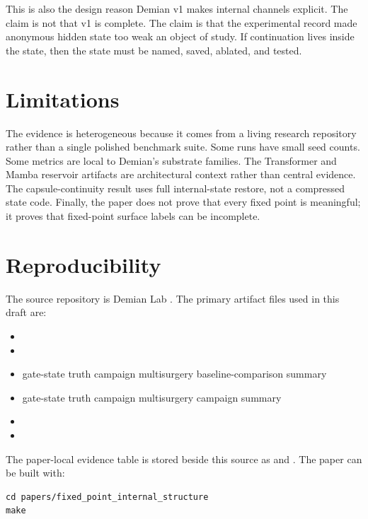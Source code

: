 \documentclass[11pt]{article}
\begin{document}
This is also the design reason Demian v1 makes internal channels explicit. The
claim is not that v1 is complete. The claim is that the experimental record
made anonymous hidden state too weak an object of study. If continuation lives
inside the state, then the state must be named, saved, ablated, and tested.

\section{Limitations}

The evidence is heterogeneous because it comes from a living research
repository rather than a single polished benchmark suite. Some runs have small
seed counts. Some metrics are local to Demian's substrate families. The
Transformer and Mamba reservoir artifacts are architectural context rather
than central evidence. The capsule-continuity result uses full internal-state
restore, not a compressed state code. Finally, the paper does not prove that
every fixed point is meaningful; it proves that fixed-point surface labels can
be incomplete.

\section{Reproducibility}

The source repository is Demian Lab \citep{demianlab2026}. The primary
artifact files used in this draft are:

\begin{itemize}
  \item {}
  \item {}
  \item gate-state truth campaign multisurgery baseline-comparison summary
  \item gate-state truth campaign multisurgery campaign summary
  \item {}
  \item {}
\end{itemize}

The paper-local evidence table is stored beside this source as
 and . The paper can be
built with:

\begin{verbatim}
cd papers/fixed_point_internal_structure
make
\end{verbatim}
\end{document}
